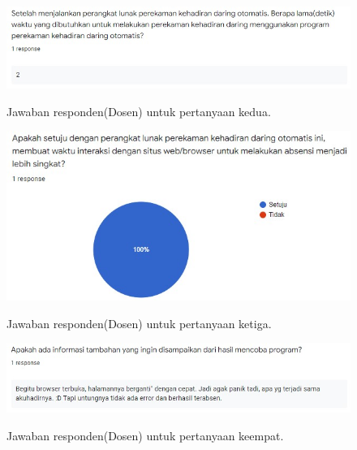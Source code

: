 \begin{figure}[H]
	\centering
	\includegraphics[scale=0.75]{Gambar/SurveiDosen2.jpg}
	\label{}
	\caption{Jawaban responden(Dosen) untuk pertanyaan kedua.}
\end{figure}

\begin{figure}[H]
	\centering
	\includegraphics[scale=0.75]{Gambar/SurveiDosen3.jpg}
	\label{}
	\caption{Jawaban responden(Dosen) untuk pertanyaan ketiga.}
\end{figure}	

\begin{figure}[H]
	\centering
	\includegraphics[scale=0.75]{Gambar/SurveiDosen4.jpg}
	\label{}
	\caption{Jawaban responden(Dosen) untuk pertanyaan keempat.}
\end{figure}	
